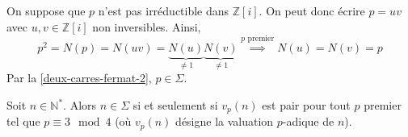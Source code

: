 	\begin{demonstration}
		On suppose que $p$ n'est pas irréductible dans $\mathbb{Z}[i]$. On peut donc écrire $p = uv$ avec $u, v \in \mathbb{Z}[i]$ non inversibles. Ainsi,
		\[ p^2 = N(p) = N(uv) = \underbrace{N(u)}_{\neq 1} \underbrace{N(v)}_{\neq 1} \overset{p \text{ premier}}{\implies} N(u) = N(v) = p \]
		Par la \cref{deux-carres-fermat-2}, $p \in \Sigma$.
	\end{demonstration}

	\begin{theorem}
		Soit $n \in \mathbb{N}^*$. Alors $n \in \Sigma$ si et seulement si $v_p(n)$ est pair pour tout $p$ premier tel que $p \equiv 3 \mod 4$ (où $v_p(n)$ désigne la valuation $p$-adique de $n$).
	\end{theorem}

